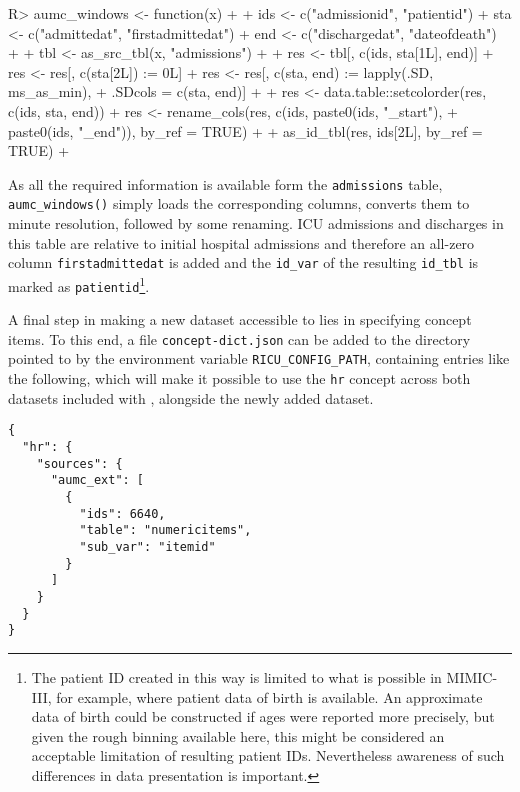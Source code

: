\documentclass[
  notitle]{jss}
\begin{document}
\begin{CodeChunk}
\begin{CodeInput}
R> aumc_windows <- function(x) {
+ 
+   ids <- c("admissionid", "patientid")
+   sta <- c("admittedat", "firstadmittedat")
+   end <- c("dischargedat", "dateofdeath")
+ 
+   tbl <- as_src_tbl(x, "admissions")
+ 
+   res <- tbl[, c(ids, sta[1L], end)]
+   res <- res[, c(sta[2L]) := 0L]
+   res <- res[, c(sta, end) := lapply(.SD, ms_as_min),
+              .SDcols = c(sta, end)]
+ 
+   res <- data.table::setcolorder(res, c(ids, sta, end))
+   res <- rename_cols(res, c(ids, paste0(ids, "_start"),
+                                  paste0(ids, "_end")), by_ref = TRUE)
+ 
+   as_id_tbl(res, ids[2L], by_ref = TRUE)
+ }
\end{CodeInput}
\end{CodeChunk}

As all the required information is available form the
\texttt{admissions} table, \texttt{aumc\_windows()} simply loads the
corresponding columns, converts them to minute resolution, followed by
some renaming. ICU admissions and discharges in this table are relative
to initial hospital admissions and therefore an all-zero column
\texttt{firstadmittedat} is added and the \texttt{id\_var} of the
resulting \texttt{id\_tbl} is marked as \texttt{patientid}\footnote{The
  patient ID created in this way is limited to what is possible in
  MIMIC-III, for example, where patient data of birth is available. An
  approximate data of birth could be constructed if ages were reported
  more precisely, but given the rough binning available here, this might
  be considered an acceptable limitation of resulting patient IDs.
  Nevertheless awareness of such differences in data presentation is
  important.}.

A final step in making a new dataset accessible to  lies in
specifying concept items. To this end, a file \texttt{concept-dict.json}
can be added to the directory pointed to by the environment variable
\texttt{RICU\_CONFIG\_PATH}, containing entries like the following,
which will make it possible to use the \texttt{hr} concept across both
datasets included with , alongside the newly added dataset.

\begin{verbatim}
{
  "hr": {
    "sources": {
      "aumc_ext": [
        {
          "ids": 6640,
          "table": "numericitems",
          "sub_var": "itemid"
        }
      ]
    }
  }
}
\end{verbatim}
\end{document}
